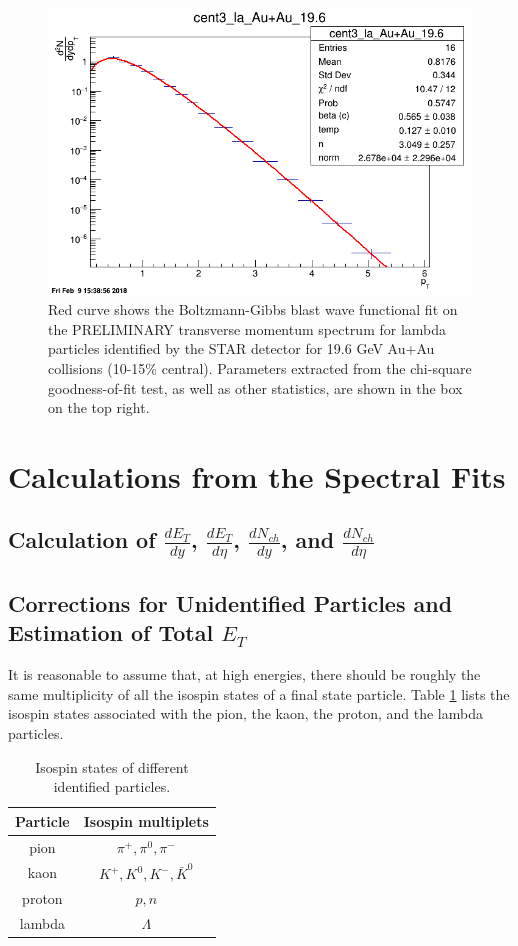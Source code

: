 	\begin{figure}[h]
	  \centering
	  \includegraphics[width=4.5in]{figures/cent3_la_Au+Au_196.png}
	  \caption{Red curve shows the Boltzmann-Gibbs blast wave functional fit on the PRELIMINARY transverse momentum spectrum for lambda particles identified by the STAR detector for 19.6 GeV Au+Au collisions (10-15\% central). Parameters extracted from the chi-square goodness-of-fit test, as well as other statistics, are shown in the box on the top right.}\label{fig:fit}
	\end{figure}

\section{Calculations from the Spectral Fits}
\subsection{Calculation of $\frac{dE_{T}}{dy}$, $\frac{dE_{T}}{d\eta}$, $\frac{dN_{ch}}{dy}$, and $\frac{dN_{ch}}{d\eta}$}
\subsection{Corrections for Unidentified Particles and Estimation of Total $E_{T}$}
It is reasonable to assume that, at high energies, there should be roughly the same multiplicity of all the isospin states of a final state particle. Table \ref{table:isospinStates} lists the isospin states associated with the pion, the kaon, the proton, and the lambda particles.

	\begin{table}[h!]
	\centering
	\begin{tabular}{|c c|}
	\hline
	Particle & Isospin multiplets \\ [0.5ex]
	\hline
	\hline
	pion & $\pi^{+}, \pi^{0}, \pi^{-} $ \\
	kaon & $K^{+}, K^{0}, K^{-}, \bar{K}^{0}$ \\
	proton & $p, n$  \\
	lambda & $\Lambda$  \\ [1ex]
	\hline
	\end{tabular}
	\caption{Isospin states of different identified particles.}
	\label{table:isospinStates}
	\end{table}
	
